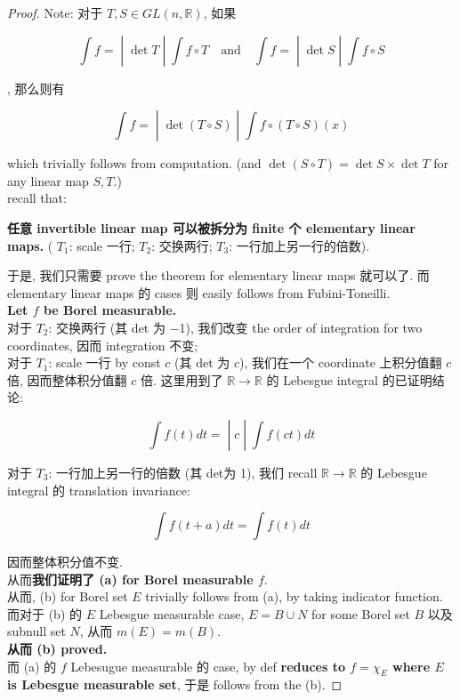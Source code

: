 \begin{proof}

Note: 对于 \(T,S \in GL(n,\mathbb{R})\), 如果

\[\left. \int f = \middle| \det T \middle| \int f \circ T\quad\text{and}\quad\int f = \middle| \det S \middle| \int f \circ S \right.\]

, 那么则有

\[\left. \int f = \middle| \det(T \circ S) \middle| \int f \circ (T \circ S)(x) \right.\]

which trivially follows from computation. (and \(\det(S \circ T) = \det S \times \det T\) for any linear map \(S,T\).)\\
recall that:

\begin{lemma}{}

\textbf{任意 invertible linear map 可以被拆分为 finite 个 elementary linear maps.} ( \(T_{1}\): scale 一行; \(T_{2}\): 交换两行; \(T_{3}\): 一行加上另一行的倍数).

\end{lemma}

于是, 我们只需要 prove the theorem for elementary linear maps 就可以了. 而 elementary linear maps 的 cases 则 easily follows from Fubini-Toneilli.\\
\textbf{Let \(f\) be Borel measurable.}\\
对于 \(T_{2}\): 交换两行 (其 det 为 −1), 我们改变 the order of integration for two coordinates, 因而 integration 不变;\\
对于 \(T_{1}\): scale 一行 by const \(c\) (其 det 为 \(c\)), 我们在一个 coordinate 上积分值翻 \(c\) 倍, 因而整体积分值翻 \(c\) 倍. 这里用到了 \(\mathbb{R}\rightarrow\mathbb{R}\) 的 Lebesgue integral 的已证明结论:

\[\left. \int f(t) dt = \middle| c \middle| \int f(ct) dt \right.\]

对于 \(T_{3}\): 一行加上另一行的倍数 (其 det为 1), 我们 recall \(\mathbb{R}\rightarrow\mathbb{R}\) 的 Lebesgue integral 的 translation invariance:

\[\int f(t + a) dt = \int f(t) dt\]

因而整体积分值不变.\\
从而\textbf{我们证明了 (a) for Borel measurable \(f\)}.\\
从而, (b) for Borel set \(E\) trivially follows from (a), by taking indicator function.\\
而对于 (b) 的 \(E\) Lebesgue measurable case, \(E = B \cup N\) for some Borel set \(B\) 以及 subnull set \(N\), 从而 \(m(E) = m(B)\).\\
\textbf{从而 (b) proved.}\\
而 (a) 的 \(f\) Lebesugue measurable 的 case, by def \textbf{reduces to \(f = \chi_{E}\) where \(E\) is Lebesgue measurable set}, 于是 follows from the (b).

\end{proof}

